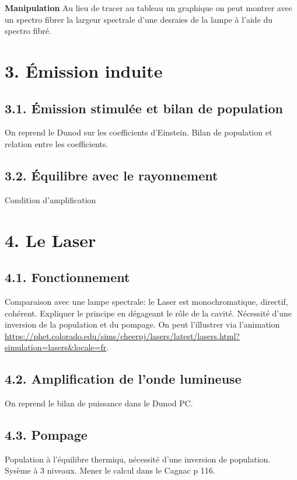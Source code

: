 \documentclass[french, a4paper, 10pt, twocolumn, landscape]{article}
\begin{document}
\textbf{Manipulation} Au lieu de tracer au tableau un graphique on peut montrer avec un spectro fibrer la largeur spectrale d'une desraies de la lampe à l'aide du spectro fibré.

\section*{3. Émission induite}

\subsection*{3.1. Émission stimulée et bilan de population}

On reprend le Dunod sur les coefficients d'Einstein.
Bilan de population et relation entre les coefficients.

\subsection*{3.2. Équilibre avec le rayonnement }
Condition d'amplification 


\section*{4. Le Laser}

\subsection*{4.1. Fonctionnement}
Comparaison avec une lampe spectrale: le Laser est monochromatique, directif, cohérent. Expliquer le principe en dégageant le rôle de la cavité. Nécessité d'une inversion de la population et du pompage. On peut l'illustrer via l'animation \url{https://phet.colorado.edu/sims/cheerpj/lasers/latest/lasers.html?simulation=lasers&locale=fr}.

\subsection*{4.2. Amplification de l'onde lumineuse}

On reprend le bilan de puissance dans le Dunod PC.

\subsection*{4.3. Pompage}

Population à l'équilibre thermiqu, nécessité d'une inversion de population. Sysème à 3 niveaux. Mener le calcul dans le Cagnac p 116.
\end{document}
